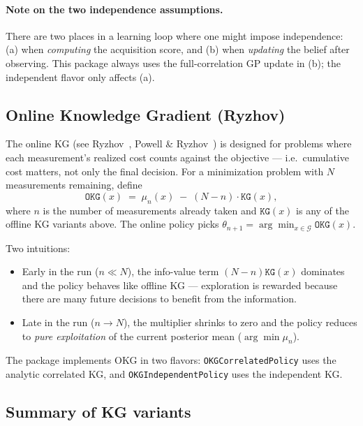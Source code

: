 \documentclass[11pt]{article}
\newcommand{\Cstar}{\theta}
\newcommand{\muN}{\mu_n}
\newcommand{\code}[1]{\texttt{#1}}
\begin{document}
\paragraph{Note on the two independence assumptions.} There are two places
in a learning loop where one might impose independence: (a) when
\emph{computing} the acquisition score, and (b) when \emph{updating} the
belief after observing. This package always uses the full-correlation GP
update in (b); the independent flavor only affects (a).

\subsection{Online Knowledge Gradient (Ryzhov)}
\label{sec:policies:okg}

The online KG (see Ryzhov~\cite{ryzhov2010}, Powell \&
Ryzhov~\cite{ryzhov2012optimal}) is designed for problems where each
measurement's realized cost counts against the objective — i.e.\ cumulative
cost matters, not only the final decision. For a minimization problem with
$N$ measurements remaining, define
\begin{equation}
  \code{OKG}(x) \;=\; \muN(x) \;-\; (N - n) \cdot \code{KG}(x),
  \label{eq:okg}
\end{equation}
where $n$ is the number of measurements already taken and $\code{KG}(x)$ is
any of the offline KG variants above. The online policy picks $\Cstar_{n+1}
= \arg\min_{x \in \mathcal{G}} \code{OKG}(x)$.

Two intuitions:
\begin{itemize}[nosep]
  \item Early in the run ($n \ll N$), the info-value term $(N-n)\code{KG}(x)$
    dominates and the policy behaves like offline KG — exploration is
    rewarded because there are many future decisions to benefit from the
    information.
  \item Late in the run ($n \to N$), the multiplier shrinks to zero and the
    policy reduces to \emph{pure exploitation} of the current posterior
    mean ($\arg\min \muN$).
\end{itemize}
The package implements OKG in two flavors: \code{OKGCorrelatedPolicy} uses
the analytic correlated KG, and \code{OKGIndependentPolicy} uses the
independent KG.

\subsection{Summary of KG variants}
\label{sec:policies:summary}
\end{document}
